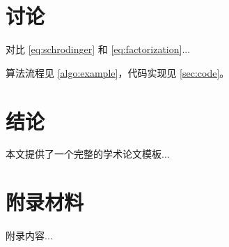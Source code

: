 \documentclass[12pt, a4paper]{article}
\begin{document}
\section{讨论}

对比 \cref{eq:schrodinger} 和 \cref{eq:factorization}...

算法流程见 \cref{algo:example}，代码实现见 \cref{sec:code}。

\section{结论}

本文提供了一个完整的学术论文模板...

\newpage
\printbibliography

\appendix
\section{附录材料}

附录内容...
\end{document}
